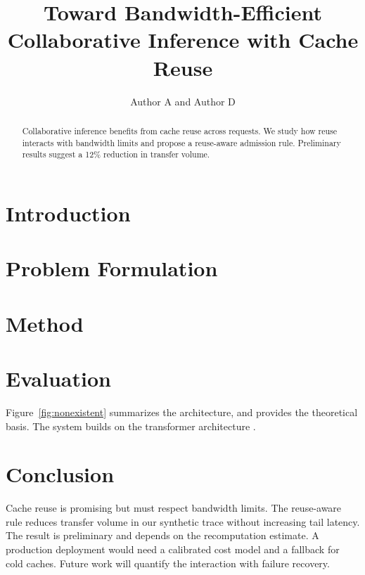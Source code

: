 \documentclass[conference]{IEEEtran}
\title{Toward Bandwidth-Efficient Collaborative Inference with Cache Reuse}
\author{Author A and Author D}
\begin{document}
\maketitle


\begin{abstract}
Collaborative inference benefits from cache reuse across requests.
We study how reuse interacts with bandwidth limits and propose a reuse-aware admission rule.
Preliminary results suggest a 12\% reduction in transfer volume.
\end{abstract}

\section{Introduction}
\label{sec:intro}


\section{Problem Formulation}
\label{sec:problem}


\section{Method}
\label{sec:method}


\section{Evaluation}
\label{sec:eval}


Figure~\ref{fig:nonexistent} summarizes the architecture, and \cite{missing2026} provides the theoretical basis.
The system builds on the transformer architecture \cite{vaswani2017}.

\section{Conclusion}
\label{sec:conclusion}
Cache reuse is promising but must respect bandwidth limits.
The reuse-aware rule reduces transfer volume in our synthetic trace without increasing tail latency.
The result is preliminary and depends on the recomputation estimate.
A production deployment would need a calibrated cost model and a fallback for cold caches.
Future work will quantify the interaction with failure recovery.



\end{document}
